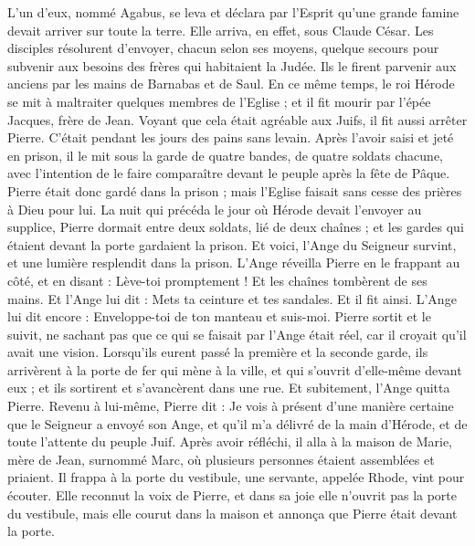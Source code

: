 \begin{multicols}{2}
L’un d'eux, nommé Agabus, se leva et déclara par l'Esprit qu'une grande famine devait arriver sur toute la terre. Elle arriva, en effet, sous Claude César.
Les disciples résolurent d’envoyer, chacun selon ses moyens, quelque secours pour subvenir aux besoins des frères qui habitaient la Judée.
Ils le firent parvenir aux anciens par les mains de Barnabas et de Saul.
\VerseOne{}En ce même temps, le roi Hérode se mit à maltraiter quelques membres de l'Eglise ;
et il fit mourir par l'épée Jacques, frère de Jean.
Voyant que cela était agréable aux Juifs, il fit aussi arrêter Pierre. C’était pendant les jours des pains sans levain.
Après l’avoir saisi et jeté en prison, il le mit sous la garde de quatre bandes, de quatre soldats chacune, avec l’intention de le faire comparaître devant le peuple après la fête de Pâque.
Pierre était donc gardé dans la prison ; mais l'Eglise faisait sans cesse des prières à Dieu pour lui.
La nuit qui précéda le jour où Hérode devait l’envoyer au supplice, Pierre dormait entre deux soldats, lié de deux chaînes ; et les gardes qui étaient devant la porte gardaient la prison.
Et voici, l’Ange du Seigneur survint, et une lumière resplendit dans la prison. L’Ange réveilla Pierre en le frappant au côté, et en disant : Lève-toi promptement ! Et les chaînes tombèrent de ses mains.
Et l'Ange lui dit : Mets ta ceinture et tes sandales. Et il fit ainsi. L’Ange lui dit encore : Enveloppe-toi de ton manteau et suis-moi.
Pierre sortit et le suivit, ne sachant pas que ce qui se faisait par l’Ange était réel, car il croyait qu’il avait une vision.
Lorsqu’ils eurent passé la première et la seconde garde, ils arrivèrent à la porte de fer qui mène à la ville, et qui s’ouvrit d’elle-même devant eux ; et ils sortirent et s’avancèrent dans une rue. Et subitement, l'Ange quitta Pierre.
Revenu à lui-même, Pierre dit : Je vois à présent d’une manière certaine que le Seigneur a envoyé son Ange, et qu'il m'a délivré de la main d'Hérode, et de toute l'attente du peuple Juif.
Après avoir réfléchi, il alla à la maison de Marie, mère de Jean, surnommé Marc, où plusieurs personnes étaient assemblées et priaient.
Il frappa à la porte du vestibule, une servante, appelée Rhode, vint pour écouter.
Elle reconnut la voix de Pierre, et dans sa joie elle n'ouvrit pas la porte du vestibule, mais elle courut dans la maison et annonça que Pierre était devant la porte.

\end{multicols}
